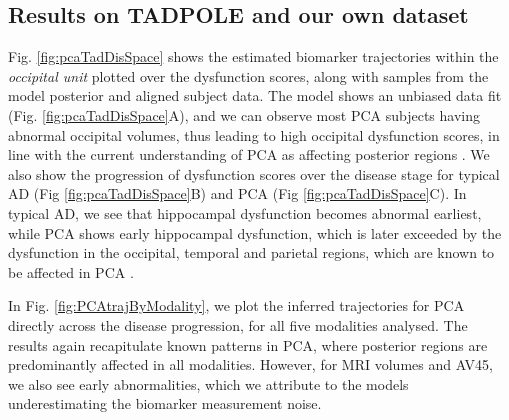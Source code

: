 \documentclass{llncs}
\begin{document}



\subsection{Results on TADPOLE and our own dataset}
\label{sec:dktResTadDrc}

Fig. \ref{fig:pcaTadDisSpace} shows the estimated biomarker trajectories within the \emph{occipital unit} plotted over the dysfunction scores, along with samples from the model posterior and aligned subject data. The model shows an unbiased data fit (Fig. \ref{fig:pcaTadDisSpace}A), and we can observe most PCA subjects having abnormal occipital volumes, thus leading to high occipital dysfunction scores, in line with the current understanding of PCA as affecting posterior regions \cite{crutch2012posterior}. We also show the progression of dysfunction scores over the disease stage for typical AD (Fig \ref{fig:pcaTadDisSpace}B) and PCA (Fig \ref{fig:pcaTadDisSpace}C). In typical AD, we see that hippocampal dysfunction becomes abnormal earliest, while PCA shows early hippocampal dysfunction, which is later exceeded by the dysfunction in the occipital, temporal and parietal regions, which are known to be affected in PCA \cite{crutch2012posterior}. 

In Fig. \ref{fig:PCAtrajByModality}, we plot the inferred trajectories for PCA directly across the disease progression, for all five modalities analysed. The results again recapitulate known patterns in PCA, where posterior regions are predominantly affected in all modalities. However, for MRI volumes and AV45, we also see early abnormalities, which we attribute to the models underestimating the biomarker measurement noise.
\end{document}
